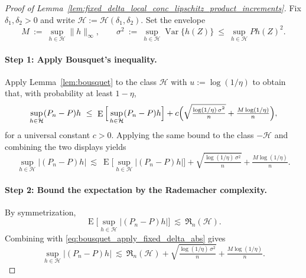 \documentclass[11pt]{article}
\theoremstyle{plain}
\theoremstyle{definition} %
\DeclareMathOperator{\E}{E}
\newcommand{\Var}{\operatorname{Var}}
\begin{document}
 

\begin{proof}[Proof of Lemma~\ref{lem:fixed_delta_local_conc_lipschitz_product_increments}]
Fix $\delta_1,\delta_2>0$ and write $\mathcal H:=\mathcal H(\delta_1,\delta_2)$.
Set the envelope
\[
M \ :=\ \sup_{h\in\mathcal H}\|h\|_\infty,
\qquad
\sigma^2 \ :=\ \sup_{h\in\mathcal H}\Var\{h(Z)\}
\ \le\ \sup_{h\in\mathcal H} P h(Z)^2 .
\]

\paragraph{Step 1: Apply Bousquet's inequality.}
Apply Lemma~\ref{lem:bousquet} to the class $\mathcal H$ with $u:=\log(1/\eta)$ to obtain that, with probability at least
$1-\eta$,
\begin{equation}
\label{eq:bousquet_apply_fixed_delta}
\sup_{h\in\mathcal H} (P_n-P)h
\ \le\
\E\Big[\sup_{h\in\mathcal H}(P_n-P)h\Big]
+
c\Bigl(
\sqrt{\tfrac{\log(1/\eta)\,\sigma^2}{n}}
+
\tfrac{M\log(1/\eta)}{n}
\Bigr),
\end{equation}
for a universal constant $c>0$. Applying the same bound to the class $-\mathcal H$ and combining the two displays yields
\begin{equation}
\label{eq:bousquet_apply_fixed_delta_abs}
\sup_{h\in\mathcal H} |(P_n-P)h|
\ \lesssim\
\E\Big[\sup_{h\in\mathcal H}|(P_n-P)h|\Big]
+
\sqrt{\tfrac{\log(1/\eta)\,\sigma^2}{n}}
+
\tfrac{M\log(1/\eta)}{n}.
\end{equation}

\paragraph{Step 2: Bound the expectation by the Rademacher complexity.}
By symmetrization,
\[
\E\Big[\sup_{h\in\mathcal H}|(P_n-P)h|\Big]
\ \lesssim\
\mathfrak R_n(\mathcal H).
\]
Combining with \eqref{eq:bousquet_apply_fixed_delta_abs} gives
\begin{equation}
\label{eq:hp_reduction_fixed_delta}
\sup_{h\in\mathcal H} |(P_n-P)h|
\ \lesssim\
\mathfrak R_n(\mathcal H)
+
\sqrt{\tfrac{\log(1/\eta)\,\sigma^2}{n}}
+
\tfrac{M\log(1/\eta)}{n}.
\end{equation}


\end{proof}
\end{document}
